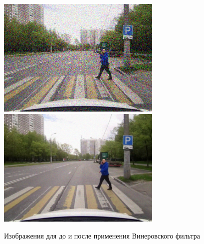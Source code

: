 \begin{figure}[ht]
    \centering
    \includegraphics[width=0.7\textwidth]{../outputs/image_gauss_noise.png}
    \includegraphics[width=0.7\textwidth]{../outputs/image_quant_filter.png}
    \caption{Изображения для до и после применения Винеровского фильтра}
    \label{fig:stitch_images}
\end{figure}

\pagebreak

